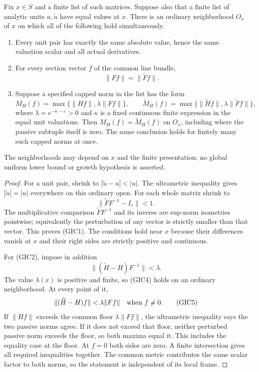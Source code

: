 \begin{lemma}
Fix $x\in S$ and a finite list of such matrices.  Suppose also
that a finite list of analytic units $u,\widetilde u$ have equal
values at $x$.  There is an ordinary neighborhood $O_x$ of $x$
on which all of the following hold simultaneously.
\begin{enumerate}
\item Every unit pair has exactly the same absolute value,
      hence the same valuation scalar and all actual derivatives.
\item For every section vector $f$ of the common line bundle,
\[
                         \|Ff\|=\|\widetilde Ff\|.
 \tag{GIC1}
\]
\item Suppose a specified capped norm in the list has the form
\[
 M_H(f)=\max\{\|Hf\|,\lambda\|Ff\|\},\qquad
 \widetilde M_H(f)=
       \max\{\|\widetilde Hf\|,\lambda\|\widetilde Ff\|\},
 \tag{GIC2}
\]
where $\lambda=e^{-\kappa-\varepsilon}>0$ and $\kappa$ is a
fixed continuous finite expression in the equal unit valuations.
Then $M_H(f)=\widetilde M_H(f)$ on $O_x$, including where
the passive subtuple itself is zero.  The same conclusion holds
for finitely many such capped norms at once.
\end{enumerate}
The neighborhoods may depend on $x$ and the finite presentation;
no global uniform lower bound or growth hypothesis is asserted.
\end{lemma}

\begin{proof}
For a unit pair, shrink to
$|\widetilde u-u|<|u|$.  The ultrametric inequality gives
$|\widetilde u|=|u|$ everywhere on this ordinary open.
For each whole matrix shrink to
\[
           \|\widetilde F F^{-1}-I_r\|<1.
 \tag{GIC3}
\]
The multiplicative comparison $\widetilde F F^{-1}$ and its
inverse are sup-norm isometries pointwise; equivalently the perturbation of any vector
is strictly smaller than that vector.  This proves (GIC1).
The conditions hold near $x$ because their differences vanish
at $x$ and their right sides are strictly positive and continuous.

For (GIC2), impose in addition
\[
                  \|(\widetilde H-H)F^{-1}\|<\lambda.
 \tag{GIC4}
\]
The value $\lambda(x)$ is positive and finite, so (GIC4) holds
on an ordinary neighborhood.  At every point of it,
\[
       \|(\widetilde H-H)f\|<\lambda\|Ff\|
                    \quad\hbox{when }f\ne0.
 \tag{GIC5}
\]
If $\|Hf\|$ exceeds the common floor $\lambda\|Ff\|$,
the ultrametric inequality says the two passive norms agree.
If it does not exceed that floor, neither perturbed passive norm
exceeds the floor, so both maxima equal it.  This includes
the equality case at the floor.  At $f=0$ both sides are zero.
A finite intersection gives all required inequalities together.
The common metric contributes the same scalar factor to both
norms, so the statement is independent of its local frame.
\end{proof}

